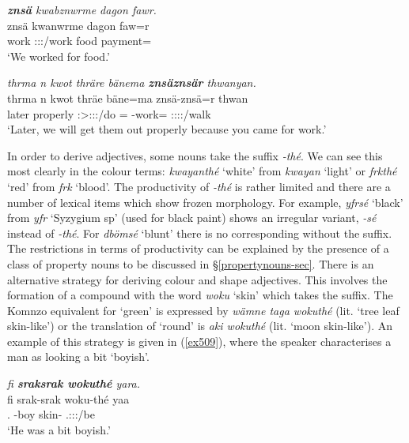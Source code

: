 \begin{exe}
	\ex \emph{\textbf{znsä} kwabznwrme dagon fawr.}\\
	\gll znsä kwanwrme dagon faw=r\\
	work \Fpl:\Sbj:\Pst:\Dur/work food payment=\Purp\\
	\trans `We worked for food.' 
	\label{ex503}
\end{exe}
\begin{exe}
	\ex \emph{thrma n kwot thräre bänema \textbf{znsäznsär} thwanyan.}\\
	\gll thrma n kwot thräe bäne=ma znsä-znsä=r thwan\\
	later {\Imn} properly \Fpl:\Sbj>\Stpl:\Obj:\Irr:\Pfv/do \Med={\Char} \Redup-work={\Purp} \Stdu:\Sbj:\Rpst:\Ipfv:\Venit/walk\\
	\trans `Later, we will get them out properly because you came for work.' 
	\label{ex504}
\end{exe}

In order to derive adjectives, some nouns take the  suffix \emph{-thé}. We can see this most clearly in the colour terms: \emph{kwayanthé} `white' from \emph{kwayan} `light' or \emph{frkthé} `red' from \emph{frk} `blood'. The productivity of \emph{-thé} is rather limited and there are a number of lexical items which show frozen morphology. For example, \emph{yfrsé} `black' from \emph{yfr} `Syzygium sp' (used for black paint) shows an irregular variant, \emph{-sé} instead of \emph{-thé}. For \emph{dbömsé} `blunt' there is no corresponding  without the suffix. The restrictions in terms of productivity can be explained by the presence of a class of property nouns to be discussed in {\S}\ref{propertynouns-sec}. There is an alternative strategy for deriving colour and shape adjectives. This involves the formation of a compound with the word \textit{woku} `skin' which takes the  suffix. The Komnzo equivalent for  `green' is expressed by \emph{wämne taga wokuthé} (lit. `tree leaf skin-like') or the translation of `round' is \emph{aki wokuthé} (lit. `moon skin-like'). An example of this strategy is given in (\ref{ex509}), where the speaker characterises a man as looking a bit `boyish'.

\begin{exe}
	\ex \emph{fi \textbf{sraksrak wokuthé} yara.}\\
	\gll fi srak-srak woku-thé yaa\\
	\Third.{\Abs} \Redup-boy skin-{\Adlzr} \Tsg.\Masc:\Sbj:\Pst:\Ipfv/be\\
	\trans `He was a bit boyish.' 
	\label{ex509}
\end{exe}

